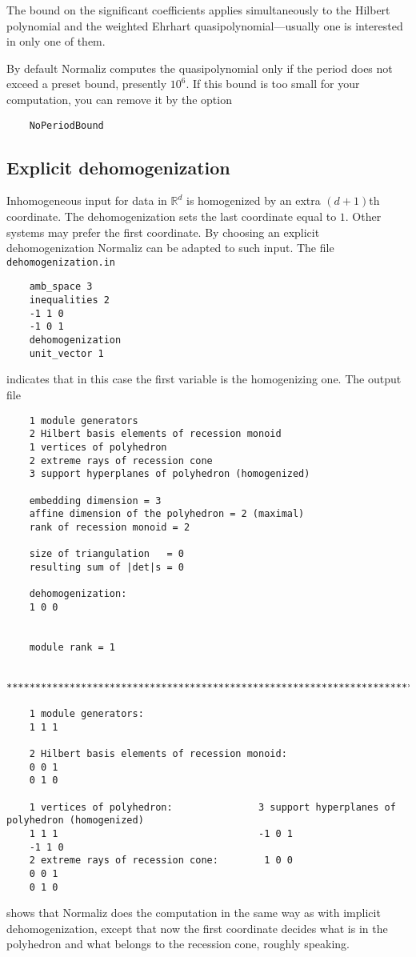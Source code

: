 \documentclass[12pt,a4paper]{scrartcl}
\theoremstyle{definition}
\def\RR{{\mathbb R}}
\begin{document}
{	The bound on the significant coefficients applies simultaneously to the Hilbert polynomial and the weighted Ehrhart quasipolynomial---usually one is interested in only one of them.
	
	By default Normaliz computes the quasipolynomial only if the period does not exceed a preset bound, presently $10^6$. If this bound is too small for your computation, you can remove it by the option
	\begin{Verbatim}
	NoPeriodBound
	\end{Verbatim}
	
	
	
	\subsection{Explicit dehomogenization}\label{dehom_ex}
	Inhomogeneous input for data in $\RR^{d}$ is homogenized by an extra $(d+1)$th coordinate. The dehomogenization sets the last coordinate equal to $1$. Other systems may prefer the first coordinate. By choosing an explicit dehomogenization Normaliz can be adapted to such input. The file \verb|dehomogenization.in|
	\begin{Verbatim}
	amb_space 3
	inequalities 2
	-1 1 0
	-1 0 1
	dehomogenization
	unit_vector 1
	\end{Verbatim}
	indicates that in this case the first variable is the homogenizing one. The output file
	\begin{Verbatim}
	1 module generators
	2 Hilbert basis elements of recession monoid
	1 vertices of polyhedron
	2 extreme rays of recession cone
	3 support hyperplanes of polyhedron (homogenized)
	
	embedding dimension = 3
	affine dimension of the polyhedron = 2 (maximal)
	rank of recession monoid = 2
	
	size of triangulation   = 0
	resulting sum of |det|s = 0
	
	dehomogenization:
	1 0 0 
	
	
	module rank = 1
	
	***********************************************************************
	
	1 module generators:
	1 1 1
	
	2 Hilbert basis elements of recession monoid:
	0 0 1
	0 1 0
	
	1 vertices of polyhedron:               3 support hyperplanes of polyhedron (homogenized)
	1 1 1                                   -1 0 1
	-1 1 0
	2 extreme rays of recession cone:        1 0 0
	0 0 1
	0 1 0
	\end{Verbatim}
	shows that Normaliz does the computation in the same way as with implicit dehomogenization, except that now the first coordinate decides what is in the polyhedron and what belongs to the recession cone, roughly speaking.
	
}
\end{document}
